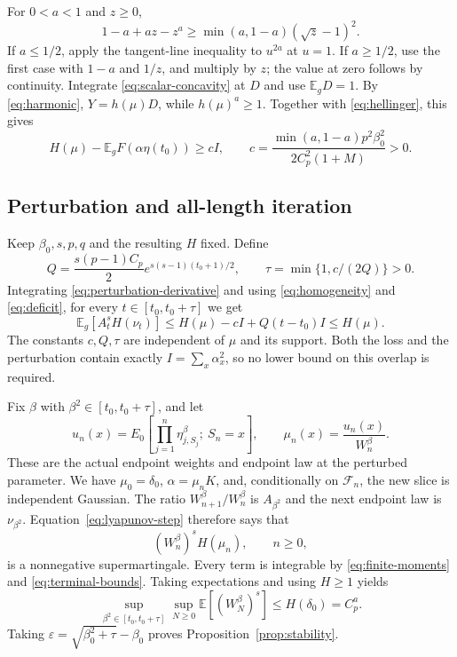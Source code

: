 \documentclass[11pt]{amsart}
\newcommand{\E}{\mathbb E}
\theoremstyle{remark}
\numberwithin{equation}{section}
\begin{document}
For $0<a<1$ and $z\ge0$,
\begin{equation}\label{eq:scalar-concavity}
 1-a+az-z^a\ge\min(a,1-a)(\sqrt z-1)^2.
\end{equation}
If $a\le1/2$, apply the tangent-line inequality to $u^{2a}$ at $u=1$.
If $a\ge1/2$, use the first case with $1-a$ and $1/z$, and multiply by $z$;
the value at zero follows by continuity. Integrate
\eqref{eq:scalar-concavity} at $D$ and use $\E_gD=1$.
By \eqref{eq:harmonic}, $Y=h(\mu)D$, while $h(\mu)^a\ge1$.
Together with \eqref{eq:hellinger}, this gives
\begin{equation}\label{eq:deficit}
 H(\mu)-\E_gF(\alpha\eta(t_0))\ge cI,\qquad
 c=\frac{\min(a,1-a)p^2\beta_0^2}{2C_p^2(1+M)}>0.
\end{equation}

\subsection{Perturbation and all-length iteration}
Keep $\beta_0,s,p,q$ and the resulting $H$ fixed. Define
\[
 Q=\frac{s(p-1)C_p}{2}e^{s(s-1)(t_0+1)/2},\qquad
 \tau=\min\{1,c/(2Q)\}>0.
\]
Integrating \eqref{eq:perturbation-derivative} and using
\eqref{eq:homogeneity} and \eqref{eq:deficit}, for every
$t\in[t_0,t_0+\tau]$ we get
\begin{equation}\label{eq:lyapunov-step}
 \E_g[A_t^sH(\nu_t)]
 \le H(\mu)-cI+Q(t-t_0)I\le H(\mu).
\end{equation}
The constants $c,Q,\tau$ are independent of $\mu$ and its support.
Both the loss and the perturbation contain exactly $I=\sum_x\alpha_x^2$,
so no lower bound on this overlap is required.

Fix $\beta$ with $\beta^2\in[t_0,t_0+\tau]$, and let
\[
 u_n(x)=E_0\!\left[\prod_{j=1}^n\eta_{j,S_j}^\beta;\ S_n=x\right],
 \qquad \mu_n(x)=\frac{u_n(x)}{W_n^\beta}.
\]
These are the actual endpoint weights and endpoint law at the perturbed
parameter. We have $\mu_0=\delta_0$, $\alpha=\mu_n K$, and, conditionally on
$\mathcal F_n$, the new slice is independent Gaussian. The ratio
$W_{n+1}^\beta/W_n^\beta$ is $A_{\beta^2}$ and the next endpoint law is
$\nu_{\beta^2}$. Equation~\eqref{eq:lyapunov-step} therefore says that
\[
 (W_n^\beta)^sH(\mu_n),\qquad n\ge0,
\]
is a nonnegative supermartingale. Every term is integrable by
\eqref{eq:finite-moments} and \eqref{eq:terminal-bounds}. Taking expectations
and using $H\ge1$ yields
\begin{equation}\label{eq:all-N}
 \sup_{\beta^2\in[t_0,t_0+\tau]}\sup_{N\ge0}
 \E[(W_N^\beta)^s]\le H(\delta_0)=C_p^a.
\end{equation}
Taking $\varepsilon=\sqrt{\beta_0^2+\tau}-\beta_0$ proves
Proposition~\ref{prop:stability}.
\end{document}
